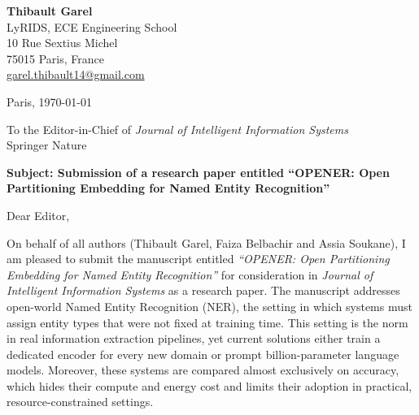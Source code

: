 \documentclass[10pt]{article}
\begin{document}
\noindent
\begin{minipage}[t]{0.55\textwidth}
\textbf{Thibault Garel}\\
LyRIDS, ECE Engineering School\\
10 Rue Sextius Michel\\
75015 Paris, France\\
\href{mailto:garel.thibault14@gmail.com}{garel.thibault14@gmail.com}
\end{minipage}
\hfill
\begin{minipage}[t]{0.35\textwidth}
\raggedleft
Paris, \today
\end{minipage}

\vspace{1.2em}

\noindent
To the Editor-in-Chief of \textit{Journal of Intelligent Information Systems}\\
Springer Nature

\vspace{0.7em}

\noindent
\textbf{Subject: Submission of a research paper entitled ``OPENER: Open Partitioning Embedding for Named Entity Recognition''}

\vspace{0.8em}

Dear Editor,

On behalf of all authors (Thibault Garel, Faiza Belbachir and Assia Soukane), I am pleased to submit the manuscript entitled \textit{``OPENER: Open Partitioning Embedding for Named Entity Recognition''} for consideration in \textit{Journal of Intelligent Information Systems} as a research paper.
The manuscript addresses open-world Named Entity Recognition (NER), the setting in which systems must assign entity types that were not fixed at training time.
This setting is the norm in real information extraction pipelines, yet current solutions either train a dedicated encoder for every new domain or prompt billion-parameter language models.
Moreover, these systems are compared almost exclusively on accuracy, which hides their compute and energy cost and limits their adoption in practical, resource-constrained settings.
\end{document}
